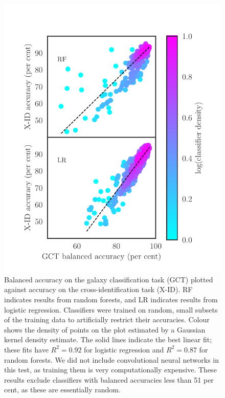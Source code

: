 \documentclass[fleqn,usenatbib,usedcolumn]{mnras}
\begin{document}
    \begin{figure}
      \centering
      \includegraphics[width=\columnwidth]{images/gct-to-xid.pdf}
      \caption{Balanced accuracy on the galaxy classification task (GCT) plotted
      against accuracy on the cross-identification task (X-ID). RF indicates
      results from random forests, and LR indicates results from logistic
      regression. Classifiers were trained on random, small subsets of the
      training data to artificially restrict their accuracies. Colour shows
      the density of points on the plot estimated by a Gaussian kernel density
      estimate. The solid lines indicate the best linear fit; these fits have
      $R^2 = 0.92$ for logistic regression and $R^2 = 0.87$ for random
      forests. We did not include convolutional neural networks in this test,
      as training them is very computationally expensive. These results
      exclude classifiers with balanced accuracies less than 51 per cent, as
      these are essentially random.
      \label{fig:gct-to-xid}}
    \end{figure}
  
\end{document}

